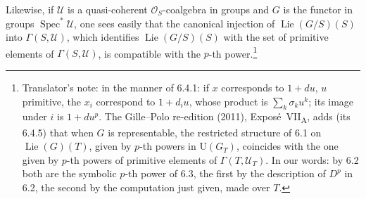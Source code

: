 Likewise, if \(\mathcal U\) is a quasi-coherent
\(\mathcal O_S\)-coalgebra in groups and \(G\) is the functor in groups
\(\operatorname{Spec}^{*}\mathcal U\), one sees easily that the
canonical injection of \(\operatorname{Lie}(G/S)(S)\) into
\(\Gamma(S,\mathcal U)\), which identifies \(\operatorname{Lie}(G/S)(S)\)
with the set of primitive elements of \(\Gamma(S,\mathcal U)\), is
compatible with the \(p\)-th power.\footnote{Translator's note: in
the manner of 6.4.1: if \(x\) corresponds to \(1+du\), \(u\) primitive,
the \(x_i\) correspond to \(1+d_iu\), whose product is
\(\sum_k\sigma_ku^k\); its image under \(i\) is \(1+du^p\). The
Gille--Polo re-edition (2011), Expos\'e~VII\textsubscript{A}, adds
(its 6.4.5) that when \(G\) is representable, the restricted structure
of 6.1 on \(\operatorname{Lie}(G)(T)\), given by \(p\)-th powers in
\(\mathrm U(G_T)\), coincides with the one given by \(p\)-th powers of
primitive elements of \(\Gamma(T,\mathcal U_T)\). In our words: by 6.2
both are the symbolic \(p\)-th power of 6.3, the first by the
description of \(D^p\) in 6.2, the second by the computation just
given, made over \(T\).}

